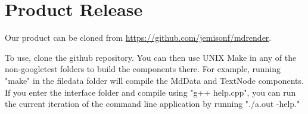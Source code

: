 \section{Product Release}

Our product can be cloned from \url{https://github.com/jemisonf/mdrender}.

To use, clone the github repository. You can then use UNIX Make in any of the non-googletest folders to build the components there. For example, running "make" in the filedata folder will compile the MdData and TextNode components. If you enter the interface folder and compile using "g++ help.cpp", you can run the current iteration of the command line application by running "./a.out -help." 
